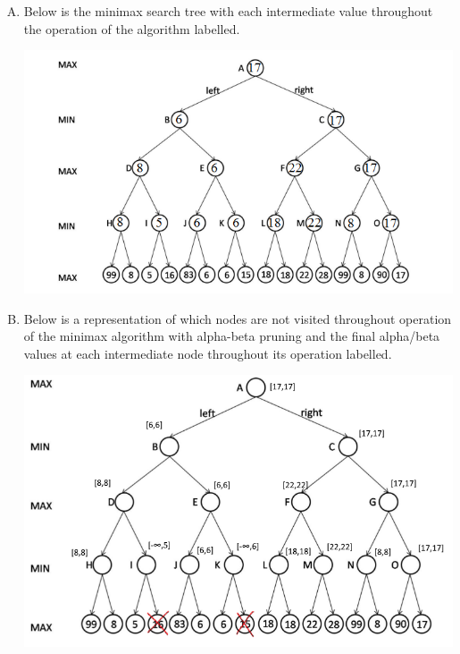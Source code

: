 \documentclass[10pt,a4paper]{article}
\begin{document}
	\begin{enumerate}[A.]
		\item
		
		Below is the minimax search tree with each intermediate value throughout the operation of the algorithm labelled.
		
		\begin{center}
			\includegraphics[scale=0.5]{Minimax}
		\end{center}
		
		\item
		
		Below is a representation of which nodes are not visited throughout operation of the minimax algorithm with alpha-beta pruning and the final alpha/beta values at each intermediate node throughout its operation labelled.
		
		\begin{center}
			\includegraphics[scale=0.5]{alphabeta}
		\end{center}
		

\end{enumerate}
\end{document}
